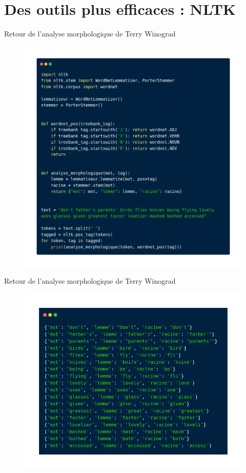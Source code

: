 \section{Des outils plus efficaces : NLTK}


\begin{frame}{Retour de l'analyse morphologique de Terry Winograd}
\begin{figure}[ht]
\includegraphics[scale=.24]{img/morpho_nltk.png}
\end{figure}
\end{frame}

\begin{frame}{Retour de l'analyse morphologique de Terry Winograd}
\begin{figure}[ht]
\includegraphics[scale=.24]{img/morpho_output_nltk.png}
\end{figure}
\end{frame}

